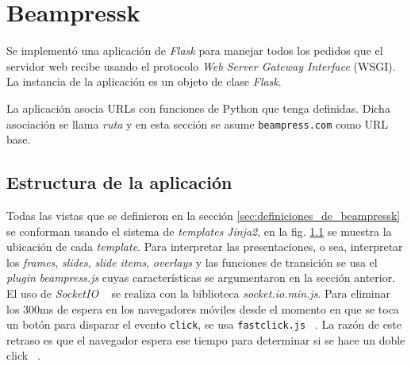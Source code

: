 	\section{Beampressk} %
	\label{sec:beampressk_imp}
		Se implementó una aplicación de \textit{Flask} para manejar todos los pedidos que el servidor web recibe usando el protocolo \textit{Web Server Gateway Interface} (WSGI). La instancia de la aplicación es un objeto de clase \textit{Flask}.

		La aplicación asocia URLs con funciones de Python que tenga definidas. Dicha asociación se llama \textit{ruta} y en esta sección se asume \texttt{beampress.com} como URL base.
		
		\subsection{Estructura de la aplicación} %
		\label{sub:estructura_de_la_aplicacion}
			Todas las vistas que se definieron en la sección \ref{sec:definiciones_de_beampressk} se conforman usando el sistema de \textit{templates} \textit{Jinja2}, en la fig. \ref{sub:estructura_de_la_aplicacion} se muestra la ubicación de cada \textit{template}.
			Para interpretar las presentaciones, o sea, interpretar los \textit{frames}, \textit{slides}, \textit{slide items}, \textit{overlays} y las funciones de transición se usa el \textit{plugin} \textit{beampress.js} cuyas características se argumentaron en la sección anterior. El uso de \textit{SocketIO} ~\cite{socketio} se realiza con la biblioteca \textit{socket.io.min.js}. Para eliminar los 300ms de espera en los navegadores móviles desde el momento en que se toca un botón para disparar el evento \texttt{click}, se usa \texttt{fastclick.js} ~\cite{fastclick}. La razón de este retraso es que el navegador espera ese tiempo para determinar si se hace un doble click ~\cite{fior}.
